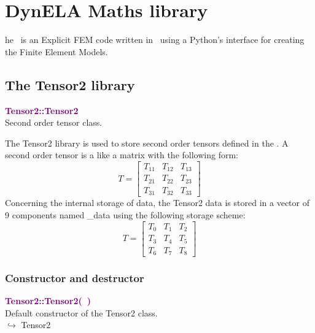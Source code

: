 %
%
%
\chapter{DynELA Maths library}

\startcontents[chapters]
\printmyminitoc[2]he \DynELA~is an Explicit FEM code written in \Cpp~using a Python's interface for creating the Finite Element Models. 

\section{The Tensor2 library}

\textcolor{purple}{\textbf{Tensor2::Tensor2}}\label{Tensor2::Tensor2}\\
Second order tensor class.

The Tensor2 library is used to store second order tensors defined in the \DynELA. A second order tensor is a like a matrix with the following form:
\begin{equation*}
T=\left[\begin{array}{ccc}
  T_{11} & T_{12} & T_{13}\\
  T_{21} & T_{22} & T_{23}\\
  T_{31} & T_{32} & T_{33}
  \end{array}\right]
\end{equation*}
Concerning the internal storage of data, the Tensor2 data is stored in a vector of 9 components named \_data using the following storage scheme:
\begin{equation*}
T=\left[\begin{array}{ccc}
    T_{0} & T_{1} & T_{2}\\
    T_{3} & T_{4} & T_{5}\\
    T_{6} & T_{7} & T_{8}
    \end{array}\right]
\end{equation*}

\subsection{Constructor and destructor}
\textcolor{purple}{\textbf{Tensor2::Tensor2(~)}}\label{Tensor2::Tensor2()}\\
Default constructor of the Tensor2 class.\\ \hspace*{10mm}$\hookrightarrow$ Tensor2

